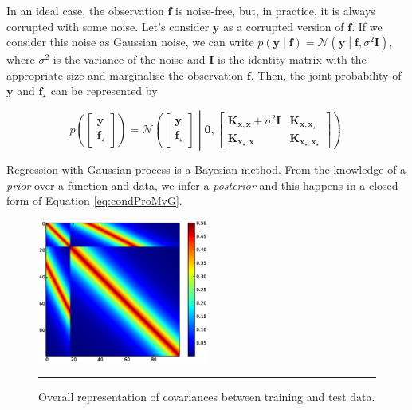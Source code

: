 In an ideal case, the observation $\mathbf{f}$ is noise-free, but, in practice, it is always corrupted with some noise. Let's consider $\mathbf{y}$ as a corrupted version of $\mathbf{f}$. If we consider this noise as Gaussian noise, we can write $p \left( \mathbf{y} \middle| \mathbf{f} \right) = \mathcal{N} \left( \mathbf{y} \middle| \mathbf{f}, \sigma^2 \mathbf{I} \right) $, where $ \sigma^2 $ is the variance of the noise and $\mathbf{I}$ is the identity matrix with the appropriate size and marginalise the observation $\mathbf{f}$. Then, the joint probability of $\mathbf{y}$ and $\mathbf{f_\star}$ can be represented by 

\begin{equation} \label{eq:jointPro_y_f*}
p \left( \begin{bmatrix} \mathbf{y} \\\mathbf{f_\star} \end{bmatrix} \right) =
\mathcal{N}\left( \begin{bmatrix} \mathbf{y} \\\mathbf{f_\star} \end{bmatrix} \middle|
\mathbf{0}, \begin{bmatrix} \mathbf{K_{x,x}}+ \sigma^2\mathbf{I} & \mathbf{K_{x,x_\star}} \\
\mathbf{K_{x_\star,x}} & \mathbf{K_{x_\star,x_\star}} \end{bmatrix} \right).
\end{equation}

Regression with Gaussian process is a Bayesian method. From the knowledge of a \emph{prior} over a function and data, we infer a \emph{posterior} and this happens in a closed form of Equation \ref{eq:condProMvG}. 

\begin{figure}[!htbp]
	\centering
	\includegraphics[width=0.5\textwidth,keepaspectratio]{diagrams/Cov_Structure.eps}
	\rule{25em}{0.5pt}
	\caption[Overall representation of covariances between training and test data]
	{Overall representation of covariances between training and test data.}
	\label{fig:Covariances_Structure}
\end{figure}


